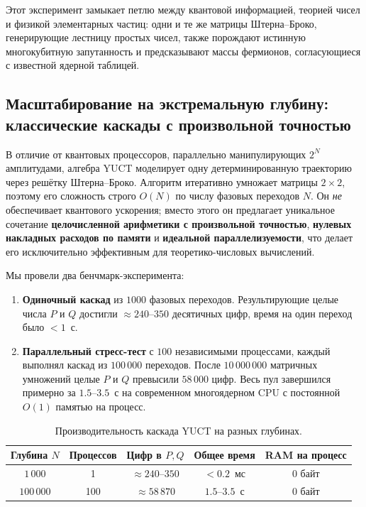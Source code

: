 \documentclass[12pt,a4paper]{article}
\begin{document}
	Этот эксперимент замыкает петлю между квантовой информацией, теорией чисел и физикой элементарных частиц: одни и те же матрицы Штерна–Броко, генерирующие лестницу простых чисел, также порождают истинную многокубитную запутанность и предсказывают массы фермионов, согласующиеся с известной ядерной таблицей.
	
	\subsection{Масштабирование на экстремальную глубину: классические каскады с произвольной точностью}
	
	В отличие от квантовых процессоров, параллельно манипулирующих $2^N$ амплитудами, алгебра YUCT моделирует одну детерминированную траекторию через решётку Штерна–Броко. Алгоритм итеративно умножает матрицы $2\times2$, поэтому его сложность строго $O(N)$ по числу фазовых переходов $N$. Он \emph{не} обеспечивает квантового ускорения; вместо этого он предлагает уникальное сочетание \textbf{целочисленной арифметики с произвольной точностью}, \textbf{нулевых накладных расходов по памяти} и \textbf{идеальной параллелизуемости}, что делает его исключительно эффективным для теоретико-числовых вычислений.
	
	Мы провели два бенчмарк-эксперимента:
	
	\begin{enumerate}[leftmargin=*]
		\item \textbf{Одиночный каскад} из $1000$ фазовых переходов. Результирующие целые числа $P$ и $Q$ достигли $\approx 240$--$350$ десятичных цифр, время на один переход было $<1$~\textmu с.
		\item \textbf{Параллельный стресс-тест} с $100$ независимыми процессами, каждый выполнял каскад из $100\,000$ переходов. После $10\,000\,000$ матричных умножений целые $P$ и $Q$ превысили $58\,000$ цифр. Весь пул завершился примерно за $1.5$--$3.5$~с на современном многоядерном CPU с постоянной $O(1)$ памятью на процесс.
	\end{enumerate}
	
	\begin{table}[htbp]
		\centering
		\caption{Производительность каскада YUCT на разных глубинах.}
		\label{tab:cascade-bench}
		\begin{tabular}{c c c c c}
			\toprule
			Глубина $N$ & Процессов & Цифр в $P,Q$ & Общее время & RAM на процесс \\
			\midrule
			$1\,000$   & 1   & $\approx 240$--$350$ & $< 0.2$\ мс & 0 байт \\
			$100\,000$ & 100 & $\approx 58\,870$     & $1.5$--$3.5$\ с & 0 байт \\
			\bottomrule
		\end{tabular}
	\end{table}
	
\end{document}
